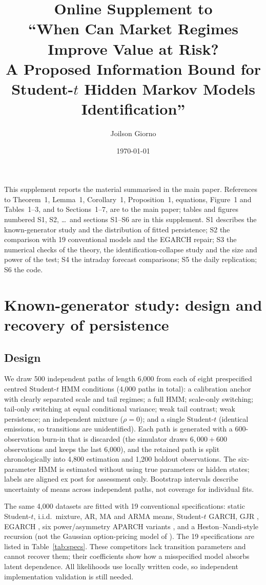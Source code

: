 \documentclass[11pt,a4paper]{article}
\title{Online Supplement to\\ ``When Can Market Regimes Improve Value at Risk?\\ A Proposed Information Bound for Student-$t$ Hidden Markov Models Identification''}
\author{Joilson Giorno}
\date{\today}
\theoremstyle{plain}
\theoremstyle{remark}
\begin{document}
\maketitle
\noindent This supplement reports the material summarised in the main paper. References to Theorem~1, Lemma~1, Corollary~1, Proposition~1, equations, Figure~1 and Tables~1--3, and to Sections~1--7, are to the main paper; tables and figures numbered S1, S2, \dots\ and sections S1--S6 are in this supplement. S1 describes the known-generator study and the distribution of fitted persistence; S2 the comparison with 19 conventional models and the EGARCH repair; S3 the numerical checks of the theory, the identification-collapse study and the size and power of the test; S4 the intraday forecast comparisons; S5 the daily replication; S6 the code.

\section{Known-generator study: design and recovery of persistence}\label{sec:dgp}

\subsection{Design}
We draw 500 independent paths of length 6{,}000 from each of eight prespecified centred Student-$t$ HMM conditions (4{,}000 paths in total): a calibration anchor with clearly separated scale and tail regimes; a full HMM; scale-only switching; tail-only switching at equal conditional variance; weak tail contrast; weak persistence; an independent mixture ($\rho=0$); and a single Student-$t$ (identical emissions, so transitions are unidentified). Each path is generated with a 600-observation burn-in that is discarded (the simulator draws $6{,}000+600$ observations and keeps the last 6{,}000), and the retained path is split chronologically into 4{,}800 estimation and 1{,}200 holdout observations. The six-parameter HMM is estimated without using true parameters or hidden states; labels are aligned ex post for assessment only. Bootstrap intervals describe uncertainty of means across independent paths, not coverage for individual fits.

The same 4{,}000 datasets are fitted with 19 conventional specifications: static Student-$t$, i.i.d.\ mixture, AR, MA and ARMA means, Student-$t$ GARCH, GJR \citep{glosten1993}, EGARCH \citep{nelson1991}, six power/asymmetry APARCH variants \citep{ding1993}, and a Heston--Nandi-style recursion (not the Gaussian option-pricing model of \citealp{hestonnandi2000}). The 19 specifications are listed in Table~\ref{tab:specs}. These competitors lack transition parameters and cannot recover them; their coefficients show how a misspecified model absorbs latent dependence. All likelihoods use locally written code, so independent implementation validation is still needed.
\end{document}
